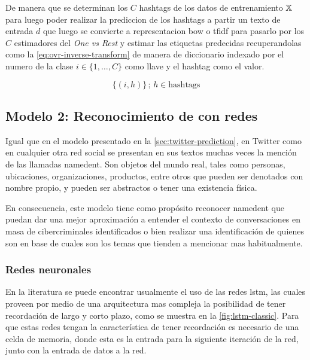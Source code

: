 De manera que se determinan los $C$ hashtags de los datos de entrenamiento ${\mathbb{X}}$ para luego poder realizar la prediccion de los hashtags a partir un texto de entrada $d$ que luego se convierte a representacion \gls{bow} o \gls{tfidf} para pasarlo por los $C$ estimadores del \emph{One vs Rest} y estimar las etiquetas predecidas recuperandolas como la \cref{eq:ovr-inverse-transform} de manera de diccionario indexado por el numero de la clase $i \in \{1, \ldots, C\}$ como llave y el hashtag como el valor.

\begin{equation} \label{eq:ovr-inverse-transform}
    \{(i, h)\} \,;\, h \in \text{hashtags}
\end{equation}


\subsection{Modelo 2: Reconocimiento de  con redes }
Igual que en el modelo presentado en la \cref{sec:twitter-prediction}, en Twitter como en cualquier otra red social se presentan en sus textos muchas veces la mención de las llamadas \gls{namedent}. Son objetos del mundo real, tales como personas, ubicaciones, organizaciones, productos, entre otros que pueden ser denotados con nombre propio, y pueden ser abstractos o tener una existencia física.

En consecuencia, este modelo tiene como propósito reconocer \gls{namedent} que puedan dar una mejor aproximación a entender el contexto de conversaciones en masa de cibercriminales identificados o bien realizar una identificación de quienes son en base de cuales son los temas que tienden a mencionar mas habitualmente.

\subsubsection{Redes neuronales }
En la literatura se puede encontrar usualmente el uso de las redes \gls{lstm}, las cuales proveen por medio de una arquitectura mas compleja la posibilidad de tener recordación de largo y corto plazo, como se muestra en la \cref{fig:lstm-classic}. Para que estas redes tengan la característica de tener recordación es necesario de una celda de memoria, donde esta es la entrada para la siguiente iteración de la red, junto con la entrada de datos a la red.

